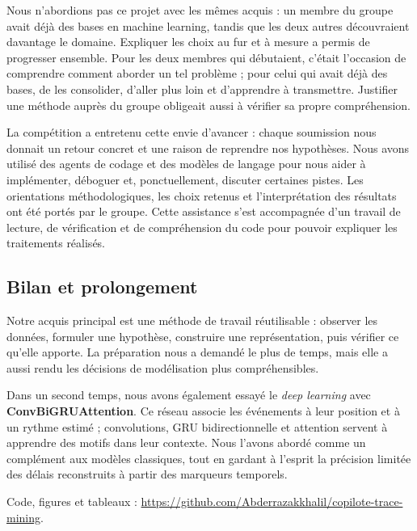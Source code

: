 \documentclass{rapportECL}
\begin{document}
Nous n'abordions pas ce projet avec les mêmes acquis : un membre du groupe avait déjà des bases en machine learning, tandis que les deux autres découvraient davantage le domaine. Expliquer les choix au fur et à mesure a permis de progresser ensemble. Pour les deux membres qui débutaient, c'était l'occasion de comprendre comment aborder un tel problème ; pour celui qui avait déjà des bases, de les consolider, d'aller plus loin et d'apprendre à transmettre. Justifier une méthode auprès du groupe obligeait aussi à vérifier sa propre compréhension.

La compétition a entretenu cette envie d'avancer : chaque soumission nous donnait un retour concret et une raison de reprendre nos hypothèses. Nous avons utilisé des agents de codage et des modèles de langage pour nous aider à implémenter, déboguer et, ponctuellement, discuter certaines pistes. Les orientations méthodologiques, les choix retenus et l'interprétation des résultats ont été portés par le groupe. Cette assistance s'est accompagnée d'un travail de lecture, de vérification et de compréhension du code pour pouvoir expliquer les traitements réalisés.

\subsection{Bilan et prolongement}

Notre acquis principal est une méthode de travail réutilisable : observer les données, formuler une hypothèse, construire une représentation, puis vérifier ce qu'elle apporte. La préparation nous a demandé le plus de temps, mais elle a aussi rendu les décisions de modélisation plus compréhensibles.

Dans un second temps, nous avons également essayé le \emph{deep learning} avec \textbf{ConvBiGRUAttention}. Ce réseau associe les événements à leur position et à un rythme estimé ; convolutions, GRU bidirectionnelle et attention servent à apprendre des motifs dans leur contexte. Nous l'avons abordé comme un complément aux modèles classiques, tout en gardant à l'esprit la précision limitée des délais reconstruits à partir des marqueurs temporels.

\smallskip
{\small Code, figures et tableaux : \url{https://github.com/Abderrazakkhalil/copilote-trace-mining}.}
\end{document}
